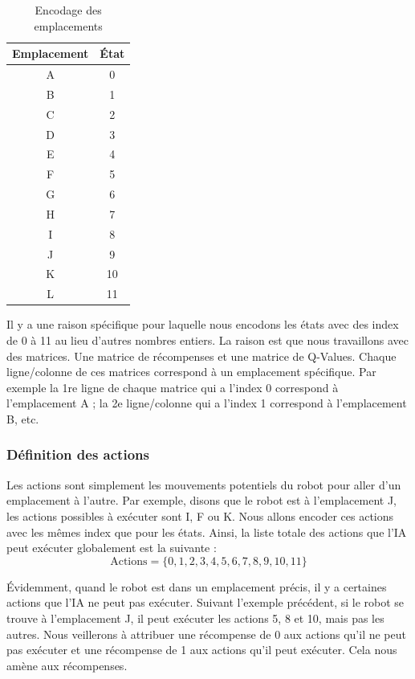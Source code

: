 \documentclass{article}
\begin{document}
\begin{table}[H]
    \centering
    \begin{tabular}{|c|c|}
        \hline
        Emplacement & État \\
        \hline
        A & 0 \\
        B & 1 \\
        C & 2 \\
        D & 3 \\
        E & 4 \\
        F & 5 \\
        G & 6 \\
        H & 7 \\
        I & 8 \\
        J & 9 \\
        K & 10 \\
        L & 11 \\
        \hline
    \end{tabular}
    \caption{Encodage des emplacements}
\end{table}
Il y a une raison spécifique pour laquelle nous encodons les états avec des index de 0 à 11 au lieu d'autres nombres entiers. La raison est que nous travaillons avec des matrices. Une matrice de récompenses et une matrice de Q-Values. Chaque ligne/colonne de ces matrices correspond à un emplacement spécifique. Par exemple la 1re ligne de chaque matrice qui a l'index 0 correspond à l'emplacement A ; la 2e ligne/colonne qui a l'index 1 correspond à l'emplacement B, etc. 

\subsubsection{Définition des actions}
Les actions sont simplement les mouvements potentiels du robot pour aller d'un emplacement à l'autre. Par exemple, disons que le robot est à l'emplacement J, les actions possibles à exécuter sont I, F ou K. Nous allons encoder ces actions avec les mêmes index que pour les états. Ainsi, la liste totale des actions que l'IA peut exécuter globalement est la suivante :
\[ \text{Actions} = \{0,1,2,3,4,5,6,7,8,9,10,11\} \]

Évidemment, quand le robot est dans un emplacement précis, il y a certaines actions que l'IA ne peut pas exécuter. Suivant l'exemple précédent, si le robot se trouve à l'emplacement J, il peut exécuter les actions 5, 8 et 10, mais pas les autres. Nous veillerons à attribuer une récompense de 0 aux actions qu'il ne peut pas exécuter et une récompense de 1 aux actions qu'il peut exécuter. Cela nous amène aux récompenses.
\end{document}
